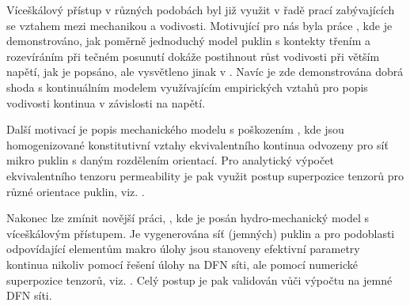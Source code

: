 \documentclass{article}
\begin{document}
Víceškálový přístup v různých podobách byl již využit v řadě prací zabývajících se vztahem mezi mechanikou a vodivosti. 
Motivující pro nás byla práce \cite{Min2004a}, kde je demonstrováno, jak poměrně jednoduchý model puklin s 
kontekty třením a rozevíráním při tečném posunutí
dokáže postihnout růst vodivosti při větším napětí, jak je popsáno, ale vysvětleno jinak v \cite{Souley2001}.
Navíc je zde demonstrována dobrá shoda s kontinuálním modelem využívajícím empirických vztahů pro popis vodivosti kontinua v závislosti na napětí.

Další motivací je popis mechanického modelu s poškozením \cite{Shao2005}, kde jsou homogenizované konstitutivní vztahy ekvivalentního kontinua
odvozeny pro síť mikro puklin s daným rozdělením orientací. Pro analytický výpočet ekvivalentního tenzoru permeability je pak využit postup superpozice tenzorů 
pro různé orientace puklin, viz. \cite{Oda1986a}.

Nakonec lze zmínit novější práci, \cite{Rutqvist2013}, kde je posán hydro-mechanický model s víceškálovým přístupem. Je vygenerována síť (jemných) 
puklin a pro podoblasti odpovídající elementům makro úlohy jsou stanoveny efektivní parametry kontinua nikoliv pomocí řešení  úlohy na DFN síti, 
ale pomocí numerické superpozice tenzorů, viz. \cite{Oda1986a}. Celý postup je pak validován vůči výpočtu na jemné DFN síti.



% 
% 
\end{document}
